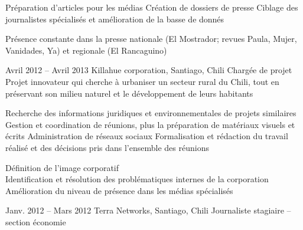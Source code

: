 \documentclass[30pt, french]{tccv}
\begin{document}
\begin{upshape}
\begin{textblock}{13.3}
\begin{mdframed}
\begin{eventlist}
\setlength{\parskip}{-10pt}
\begin{itemize}
      \setlength\itemsep{-3pt} 
      \cvitem[\checkmark]  Préparation d'articles pour les médias                                            
      \cvitem[\checkmark]  Création de dossiers de presse                                                     
      \cvitem[\checkmark]  Ciblage des journalistes spécialisés et amélioration de la basse de donnés  
\end{itemize}       
 Présence constante dans la presse nationale (El Mostrador; revues Paula, Mujer, Vanidades, Ya) et regionale (El Rancaguino) 

\setlength{\parskip}{0pt}
\item{Avril 2012 -- Avril 2013 }     
  {Killahue corporation, Santiago, Chili}     
  {Chargée de projet}
\fontsize{9pt}{1em}\color{text}\bodyfontlight\upshape\selectfont
{} Projet innovateur qui cherche à urbaniser un secteur rural du Chili, tout en préservant son milieu naturel et le développement de leurs habitants \\
     
\setlength{\parskip}{-10pt}
\begin{itemize}
      \setlength\itemsep{-3pt} 
      \cvitem[\checkmark] Recherche des informations juridiques et environnementales de projets similaires          
      \cvitem[\checkmark] Gestion et coordination de réunions, plus la préparation de matériaux visuels et écrits   
      \cvitem[\checkmark] Administration de réseaux sociaux                                                                    
      \cvitem[\checkmark] Formalisation et rédaction du travail réalisé et des décisions pris dans l’ensemble des réunions     
\end{itemize}      

  Définition de l’image corporatif \\
\makebox[1.4cm][l]{}            Identification et résolution des problématiques internes de la corporation \\
\makebox[1.4cm][l]{} 		Amélioration du niveau de présence dans les médias spécialisés \\


  
\setlength{\parskip}{0pt}
\item{Janv. 2012 -- Mars 2012 }     
  {Terra Networks, Santiago, Chili}     
  {Journaliste stagiaire – section économie}
  \fontsize{9pt}{1em}\color{text}\bodyfontlight\upshape\selectfont


\end{eventlist}
\end{mdframed}
\end{textblock}
\end{upshape}
\end{document}
